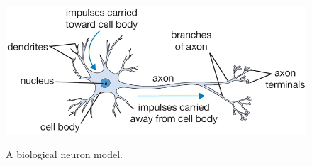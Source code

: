\begin{figure}[h]
\centering
{\includegraphics[scale=0.65]{media_tesi/neuron_model.png}}
\caption{A biological neuron model.}
\label{fig:subfig}
\end{figure}

%
%
%
%
%
%
%
\clearpage

